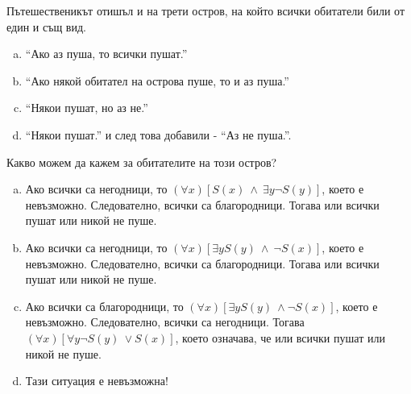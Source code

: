 \begin{problem}
  Пътешественикът отишъл и на трети остров, на който всички обитатели били от един и същ вид.
  \begin{enumerate}[a)]
  \item
    ``Ако аз пуша, то всички пушат.''
  \item
    ``Ако някой обитател на острова пуше, то и аз пуша.''
  \item
    ``Някои пушат, но аз не.''
  \item
    ``Някои пушат.'' и след това добавили - ``Аз не пуша.''.
  \end{enumerate}
  Какво можем да кажем за обитателите на този остров?
\end{problem}
\begin{solution}
  \begin{enumerate}[a)]
  \item
    Ако всички са негодници, то $(\forall x)[S(x)\ \wedge\ \exists y\neg S(y)]$,
    което е невъзможно.
    Следователно, всички са благородници. Тогава или всички пушат или никой не пуше.
  \item
    Ако всички са негодници, то $(\forall x)[\exists y S(y)\ \wedge\ \neg S(x)]$,
    което е невъзможно. Следователно, всички са благородници.
    Тогава или всички пушат или никой не пуше.
  \item
    Ако всички са благородници, то $(\forall x)[\exists y S(y)\ \wedge \neg S(x)]$,
    което е невъзможно. Следователно, всички  са негодници.
    Тогава $(\forall x)[\forall y\neg S(y)\ \vee S(x)]$, което означава, че
    или всички пушат или никой не пуше.
  \item
    Тази ситуация е невъзможна!
  \end{enumerate}
\end{solution}


